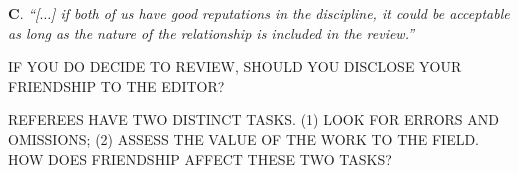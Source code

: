 \documentclass[12pt]{beamer}
\newcommand\ans[1]{{\it ``#1''}}
\newcommand\gap{\vspace{5mm}}
\begin{document}
\begin{frame}

{\bf C}. \ans{[$\dots$] if both of us have good reputations in the discipline,  it could be acceptable as long as the nature of the relationship is included in the review.}

\gap

IF YOU DO DECIDE TO REVIEW, SHOULD YOU DISCLOSE YOUR FRIENDSHIP TO THE EDITOR?

\vspace{20mm}

\gap

REFEREES HAVE TWO DISTINCT TASKS. (1) LOOK FOR ERRORS AND OMISSIONS; (2) ASSESS THE VALUE OF THE WORK TO THE FIELD. HOW DOES FRIENDSHIP AFFECT THESE TWO TASKS?





\gap












\end{frame}
\end{document}
